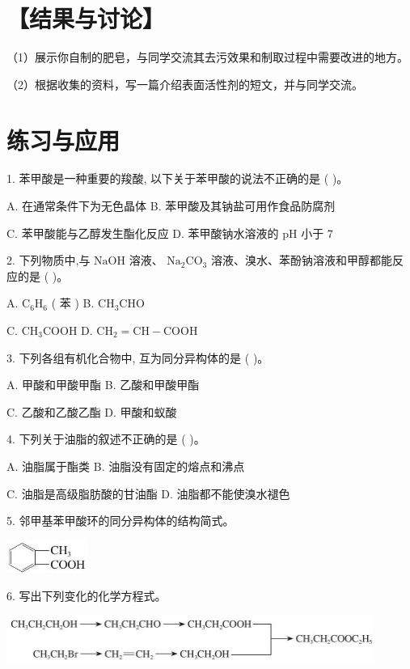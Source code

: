 \documentclass[10pt]{article}
\begin{document}
\section*{【结果与讨论】}

（1）展示你自制的肥皂，与同学交流其去污效果和制取过程中需要改进的地方。

（2）根据收集的资料，写一篇介绍表面活性剂的短文，并与同学交流。

\section*{练习与应用}

1. 苯甲酸是一种重要的羧酸, 以下关于苯甲酸的说法不正确的是 ( )。

A. 在通常条件下为无色晶体 B. 苯甲酸及其钠盐可用作食品防腐剂

C. 苯甲酸能与乙醇发生酯化反应 D. 苯甲酸钠水溶液的 \(\mathrm{{pH}}\) 小于 7

2. 下列物质中,与 \(\mathrm{{NaOH}}\) 溶液、 \({\mathrm{{Na}}}_{2}{\mathrm{{CO}}}_{3}\) 溶液、溴水、苯酚钠溶液和甲醇都能反应的是 ( )。

A. \({\mathrm{C}}_{6}{\mathrm{H}}_{6}\) ( 苯 ) B. \({\mathrm{{CH}}}_{3}\mathrm{{CHO}}\)

C. \({\mathrm{{CH}}}_{3}\mathrm{{COOH}}\) D. \({\mathrm{{CH}}}_{2} = \mathrm{{CH}} - \mathrm{{COOH}}\)

3. 下列各组有机化合物中, 互为同分异构体的是 ( )。

A. 甲酸和甲酸甲酯 B. 乙酸和甲酸甲酯

C. 乙酸和乙酸乙酯 D. 甲酸和蚁酸

4. 下列关于油脂的叙述不正确的是 ( )。

A. 油脂属于酯类 B. 油脂没有固定的熔点和沸点

C. 油脂是高级脂肪酸的甘油酯 D. 油脂都不能使溴水褪色

5. 邻甲基苯甲酸环的同分异构体的结构简式。

\begin{center}
\includegraphics[max width=0.2\textwidth]{images/0190efc5-b58a-7c43-bfb0-e0a030df9cfd_88_449414.jpg}
\end{center}

6. 写出下列变化的化学方程式。

\begin{center}
\includegraphics[max width=0.9\textwidth]{images/0190efc5-b58a-7c43-bfb0-e0a030df9cfd_88_471670.jpg}
\end{center}
\end{document}

